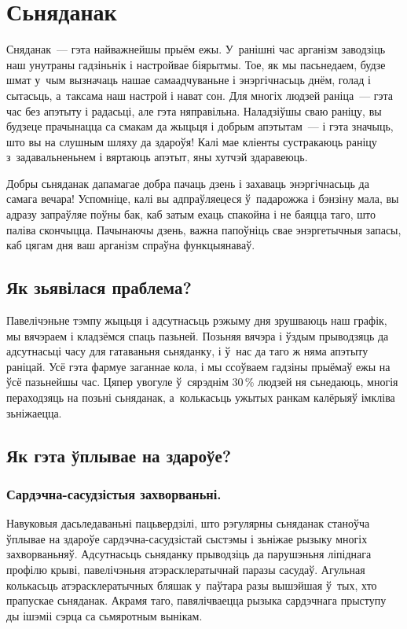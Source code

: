 \chapter{Сьняданак}

Сняданак~--- гэта найважнейшы прыём ежы. У~ранішні час арганізм заводзіць наш унутраны гадзіньнік і настройвае біярытмы. Тое, як мы пасьнедаем, будзе шмат у~чым вызначаць нашае самаадчуваньне і энэргічнасьць днём, голад і сытасьць, а~таксама наш настрой і нават сон. Для многіх людзей раніца~--- гэта час без апэтыту і радасьці, але гэта няправільна. Наладзіўшы сваю раніцу, вы будзеце прачынацца са смакам да жыцьця і добрым апэтытам~--- і гэта значыць, што вы на слушным шляху да здароўя! Калі мае кліенты сустракаюць раніцу з~задавальненьнем і вяртаюць апэтыт, яны хутчэй здаравеюць.

Добры сьняданак дапамагае добра пачаць дзень і захаваць энэргічнасьць да самага вечара! Успомніце, калі вы адпраўляецеся ў~падарожжа і бэнзіну мала, вы адразу запраўляе поўны бак, каб затым ехаць спакойна і не баяцца таго, што паліва скончыцца. Пачынаючы дзень, важна папоўніць свае энэргетычныя запасы, каб цягам дня ваш арганізм спраўна функцыянаваў.


\section{Як зьявілася праблема?}
Павелічэньне тэмпу жыцьця і адсутнасьць рэжыму дня зрушваюць наш графік, мы вячэраем і кладзёмся спаць пазьней. Позьняя вячэра і ўздым прыводзяць да адсутнасьці часу для гатаваньня сьняданку, і ў~нас да таго ж няма апэтыту раніцай. Усё гэта фармуе заганнае кола, і мы ссоўваем гадзіны прыёмаў ежы на ўсё пазьнейшы час. Цяпер увогуле ў~сярэднім 30\,\% людзей ня сьнедаюць, многія пераходзяць на позьні сьняданак, а~колькасьць ужытых ранкам калёрыяў імкліва зьніжаецца.

\section{Як гэта ўплывае на здароўе?}

\subsection{Сардэчна-сасудзістыя захворваньні.}
Навуковыя дасьледаваньні пацьвердзілі, што рэгулярны сьняданак станоўча ўплывае на здароўе сардэчна-сасудзістай сыстэмы і зьніжае рызыку многіх захворваньняў. Адсутнасьць сьняданку прыводзіць да парушэньня ліпіднага профілю крыві, павелічэньня атэрасклератычнай паразы сасудаў. Агульная колькасьць атэрасклератычных бляшак у~паўтара разы вышэйшая ў~тых, хто прапускае сьняданак. Акрамя таго, павялічваецца рызыка сардэчнага прыступу ды ішэміі сэрца са сьмяротным вынікам.

